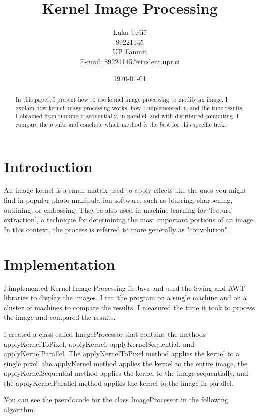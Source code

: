 \documentclass{article}
\title{Kernel Image Processing}
\author{Luka Uršič \\ 89221145 \\ UP Famnit \\ E-mail: 89221145@student.upr.si}
\date{\today}
\begin{document}
\maketitle
\thispagestyle{empty}

\begin{abstract}
    In this paper, I present how to use kernel image processing to modify an image. I explain how kernel image processing works, how I implemented it, and the time results I obtained from running it sequentially, in parallel, and with distributed computing. I compare the results and conclude which method is the best for this specific task.
\end{abstract}

\begin{multicols}{2}

    \section{Introduction}
    An image kernel is a small matrix used to apply effects like the ones you might find in popular photo manipulation software, such as blurring, sharpening, outlining, or embossing. They're also used in machine learning for 'feature extraction', a technique for determining the most important portions of an image. In this context, the process is referred to more generally as "convolution".

    \cite{setosa}

    \section{Implementation}
    I implemented Kernel Image Processing in Java and used the Swing and AWT libraries to display the images. I ran the program on a single machine and on a cluster of machines to compare the results. I measured the time it took to process the image and compared the results.

    I created a class called ImageProcessor that contains the methods applyKernelToPixel, applyKernel, applyKernelSequential, and applyKernelParallel. The applyKernelToPixel method applies the kernel to a single pixel, the applyKernel method applies the kernel to the entire image, the applyKernelSequential method applies the kernel to the image sequentially, and the applyKernelParallel method applies the kernel to the image in parallel.

    You can see the pseudocode for the class ImageProcessor in the following algorithm.


\end{multicols}
\end{document}
